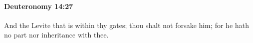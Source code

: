 
		\paragraph{Deuteronomy 14:27} %
			\label{DEUTERONOMY-14-27}

			And the Levite that is within thy gates; thou shalt not forsake him; for he hath no part nor inheritance with thee.


